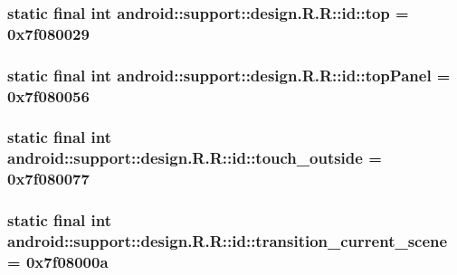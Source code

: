 \hypertarget{classandroid_1_1support_1_1design_1_1_r_1_1id_2a45df140e8492c9b44e7dceb5192a39}{
\subsubsection[{top}]{\setlength{\rightskip}{0pt plus 5cm}static final int android::support::design.R.R::id::top = 0x7f080029}}
\label{classandroid_1_1support_1_1design_1_1_r_1_1id_2a45df140e8492c9b44e7dceb5192a39}


\hypertarget{classandroid_1_1support_1_1design_1_1_r_1_1id_4c0c5977be6d8cde1a643d1570ee011a}{
\subsubsection[{topPanel}]{\setlength{\rightskip}{0pt plus 5cm}static final int android::support::design.R.R::id::topPanel = 0x7f080056}}
\label{classandroid_1_1support_1_1design_1_1_r_1_1id_4c0c5977be6d8cde1a643d1570ee011a}


\hypertarget{classandroid_1_1support_1_1design_1_1_r_1_1id_77af0f7b534352d0f5a4180439a9a10c}{
\subsubsection[{touch\_\-outside}]{\setlength{\rightskip}{0pt plus 5cm}static final int android::support::design.R.R::id::touch\_\-outside = 0x7f080077}}
\label{classandroid_1_1support_1_1design_1_1_r_1_1id_77af0f7b534352d0f5a4180439a9a10c}


\hypertarget{classandroid_1_1support_1_1design_1_1_r_1_1id_5e7131da56ee46f17e7294c7e54a0f5d}{
\subsubsection[{transition\_\-current\_\-scene}]{\setlength{\rightskip}{0pt plus 5cm}static final int android::support::design.R.R::id::transition\_\-current\_\-scene = 0x7f08000a}}
\label{classandroid_1_1support_1_1design_1_1_r_1_1id_5e7131da56ee46f17e7294c7e54a0f5d}


